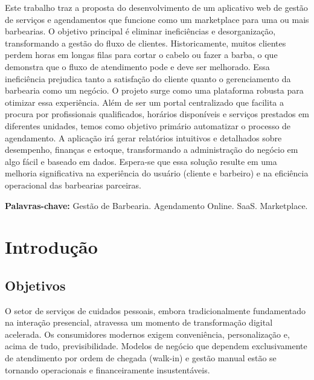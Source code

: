 \documentclass[
    12pt, 
    a4paper, 
    oneside, 
    chapter=TITLE, 
    section=TITLE
]{abntex2}
\begin{document}
\imprimircapa
\imprimirfolhaderosto

\begin{resumo}
Este trabalho traz a proposta do desenvolvimento de um aplicativo web de gestão de serviços e agendamentos que funcione como um marketplace para uma ou mais barbearias. O objetivo principal é eliminar ineficiências e desorganização, transformando a gestão do fluxo de clientes. Historicamente, muitos clientes perdem horas em longas filas para cortar o cabelo ou fazer a barba, o que demonstra que o fluxo de atendimento pode e deve ser melhorado. Essa ineficiência prejudica tanto a satisfação do cliente quanto o gerenciamento da barbearia como um negócio. O projeto surge como uma plataforma robusta para otimizar essa experiência. Além de ser um portal centralizado que facilita a procura por profissionais qualificados, horários disponíveis e serviços prestados em diferentes unidades, temos como objetivo primário automatizar o processo de agendamento. A aplicação irá gerar relatórios intuitivos e detalhados sobre desempenho, finanças e estoque, transformando a administração do negócio em algo fácil e baseado em dados. Espera-se que essa solução resulte em uma melhoria significativa na experiência do usuário (cliente e barbeiro) e na eficiência operacional das barbearias parceiras.

\vspace{\onelineskip}
\noindent \textbf{Palavras-chave:} Gestão de Barbearia. Agendamento Online. SaaS. Marketplace.
\end{resumo}

\tableofcontents
\newpage

\textual

\chapter{Introdução}
\section{Objetivos}
O setor de serviços de cuidados pessoais, embora tradicionalmente fundamentado na interação presencial, atravessa um momento de transformação digital acelerada. Os consumidores modernos exigem conveniência, personalização e, acima de tudo, previsibilidade. Modelos de negócio que dependem exclusivamente de atendimento por ordem de chegada (walk-in) e gestão manual estão se tornando operacionais e financeiramente insustentáveis.
\end{document}
